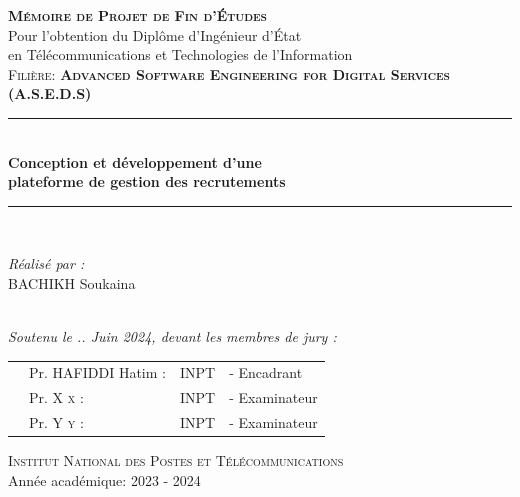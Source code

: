 \begin{titlepage}
\centering
{\LARGE \textsc{\textbf{Mémoire de Projet de Fin d’Études }}}\\[0.3cm]
{\large Pour l’obtention du Diplôme d’Ingénieur d’État\\ en Télécommunications et Technologies de l’Information }\\[0.3cm]
{ \textsc{Filière: \textbf{Advanced Software Engineering for Digital Services (A.S.E.D.S)} }}\\[0.1cm]
\vspace{0.2cm}

\rule{\linewidth}{0.4mm} \\[0.6cm] %
{ \huge \textbf{Conception et développement d'une }\\[0.2cm]\textbf{plateforme de gestion des recrutements
 }} \\[0.8cm]
\rule{\linewidth}{0.4mm} \\[0.4cm]
\vspace{0.6cm}
\noindent
\begin{minipage}{0.9\textwidth}
    \vspace{-7mm}
  \begin{flushleft} \large
    \emph{Réalisé par :} \\
     \textsc{BACHIKH} Soukaina  \\
    
  \end{flushleft}
\end{minipage}

\begin{minipage}{0.4\textwidth}
\end{minipage}\\[0.2cm]
{\large \textit{Soutenu le .. Juin 2024, devant les membres de jury : }}\\[0.5cm]
\centering

\begin{tabular}{p{2.8cm}lll}
 & \large Pr. HAFIDDI Hatim : & \large INPT & \large - Encadrant \\[0.1cm]
 & \large Pr. X \textsc{x} : & \large INPT & \large - Examinateur \\[0.1cm]
 
 & \large Pr. Y \textsc{y} : & \large INPT & \large - Examinateur  \\[0.1cm]

\end{tabular}




\vspace{6.5cm}
\textsc{Institut National des Postes et Télécommunications}\\

\vspace{0.2cm}
{\large Année académique: 2023 - 2024}

\end{titlepage}